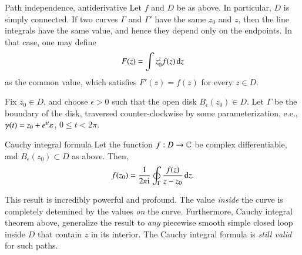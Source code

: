 \begin{myTheorem}{Path independence, antiderivative}{}
Let $f$ and $D$ be as above. In particular, $D$ is simply connected.
If two curves $\Gamma$ and $\Gamma'$ have the same $z_0$ and $z$, then the line integrals have the same value, and hence they depend only on the endpoints. In that case, one may define
\begin{equation}
    F(z) = \int z_0^z f(z) \, \mathrm{d} z
\end{equation}
as the common value, which satisfies $F'(z) = f(z)$ for every $z\in D$.
\end{myTheorem}




Fix $z_0 \in D$, and choose $\epsilon > 0$ such that the open disk $B_\epsilon(z_0) \in D$. Let $\Gamma$ be the boundary of the disk, traversed counter-clockwise by some parameterization, e.e., $\gamma(t) = z_0 + e^{\mathrm{i} t} \varepsilon$, $0 \leq t < 2\pi$.
\begin{myTheorem}{Cauchy integral formula}{}
    Let the function $f : D \to \mathbb{C}$ be complex differentiable, and $B_\epsilon(z_0)\subset D$ as above. Then,
    \begin{equation}
    f(z_0) = \frac{1}{2\pi \mathrm{i}} \oint_\Gamma \frac{f(z)}{z - z_0} \, \mathrm{d} z.
    \end{equation}
\end{myTheorem}
This result is incredibly powerful and profound. The value \emph{inside} the curve is completely detemined by the values \emph{on} the curve. Furthermore, Cauchy integral theorem above, generalize the result to  \emph{any} piecewise smooth simple closed loop inside $D$ that contain $z$ in its interior. The Cauchy integral formula is \emph{still valid} for such paths.


